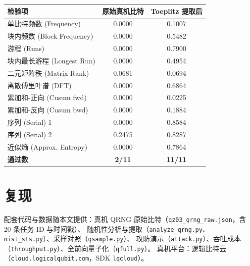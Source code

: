 \documentclass[11pt]{article}
\begin{document}
\noindent\begin{minipage}{\linewidth}\centering\small
\captionsetup{type=table}
\caption{NIST SP 800-22 中 11 项检验的 $p$ 值（$p\ge0.01$ 视为通过）。}
\label{tab:nist}
\begin{tabular}{lcc}
\toprule
检验项 & 原始真机比特 & Toeplitz 提取后 \\
\midrule
单比特频数 (Frequency) & 0.0000 & 0.1007 \\
块内频数 (Block Frequency) & 0.0000 & 0.5482 \\
游程 (Runs) & 0.0000 & 0.7900 \\
块内最长游程 (Longest Run) & 0.0000 & 0.4954 \\
二元矩阵秩 (Matrix Rank) & 0.0681 & 0.0694 \\
离散傅里叶谱 (DFT) & 0.0000 & 0.6864 \\
累加和-正向 (Cusum fwd) & 0.0000 & 0.0225 \\
累加和-反向 (Cusum bwd) & 0.0000 & 0.1884 \\
序列 (Serial) 1 & 0.0000 & 0.8584 \\
序列 (Serial) 2 & 0.2475 & 0.8287 \\
近似熵 (Approx. Entropy) & 0.0000 & 0.7864 \\
\midrule
\textbf{通过数} & \textbf{2/11} & \textbf{11/11} \\
\bottomrule
\end{tabular}
\end{minipage}

\section*{复现}
配套代码与数据随本文提供：真机 QRNG 原始比特（\texttt{qz03\_qrng\_raw.json}，含 20 条任务 ID 与时间戳）、%
随机性分析与提取（\texttt{analyze\_qrng.py}、\allowbreak\texttt{nist\_sts.py}）、采样对照（\texttt{qsample.py}）、%
攻防演示（\texttt{attack.py}）、吞吐成本（\texttt{throughput.py}）、全前向量子化（\texttt{qfull.py}）。%
真机平台：逻辑比特云（\texttt{cloud.logicalqubit.com}，SDK \texttt{lqcloud}）。
\end{document}
